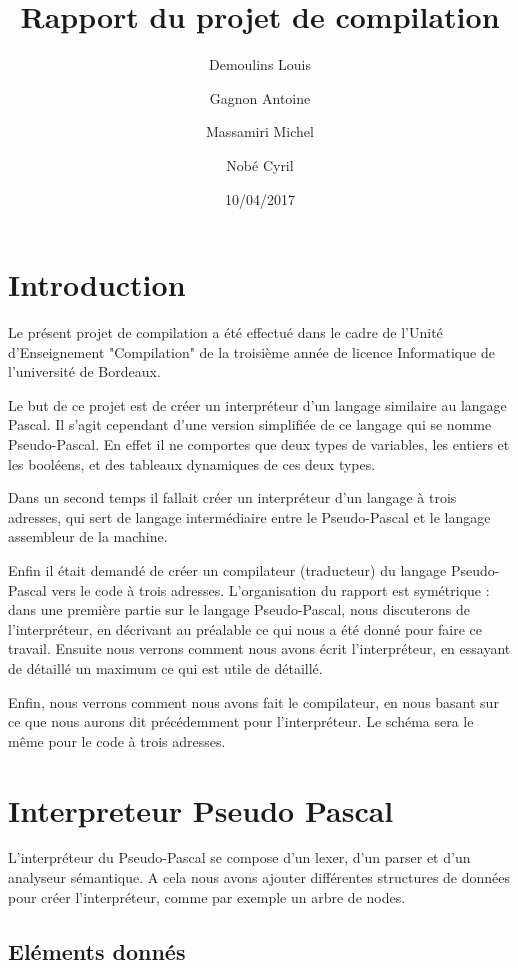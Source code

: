 \documentclass{article}
\title{Rapport du projet de compilation}
\date{10/04/2017}
\author{Demoulins Louis \and Gagnon Antoine \and Massamiri Michel \and Nobé Cyril}
\begin{document}
\maketitle
\newpage

\tableofcontents

\newpage
\section{Introduction}

Le présent projet de compilation a été effectué dans le cadre de l'Unité d'Enseignement "Compilation" de la troisième année de licence Informatique de l'université de Bordeaux.

\medbreak

Le but de ce projet est de créer un interpréteur d'un langage similaire au langage Pascal. Il s'agit cependant d'une version simplifiée de ce langage qui se nomme Pseudo-Pascal.
En effet il ne comportes que deux types de variables, les entiers et les booléens, et des tableaux dynamiques de ces deux types.

Dans un second temps il fallait créer un interpréteur d'un langage à trois adresses, qui sert de langage intermédiaire entre le Pseudo-Pascal et le langage assembleur de la machine.

Enfin il était demandé de créer un compilateur (traducteur) du langage Pseudo-Pascal vers le code à trois adresses.
\bigbreak
L'organisation du rapport est symétrique : dans une première partie sur le langage Pseudo-Pascal, nous discuterons de l'interpréteur, en décrivant au préalable ce qui nous a été donné pour faire ce travail.
Ensuite nous verrons comment nous avons écrit l'interpréteur, en essayant de détaillé un maximum ce qui est utile de détaillé.

Enfin, nous verrons comment nous avons fait le compilateur, en nous basant sur ce que nous aurons dit précédemment pour l'interpréteur.
Le schéma sera le même pour le code à trois adresses.


\newpage
\section{Interpreteur Pseudo Pascal}

L'interpréteur du Pseudo-Pascal se compose d'un lexer, d'un parser et d'un analyseur sémantique. A cela nous avons ajouter différentes structures de données pour créer l'interpréteur, comme par exemple un arbre de nodes.

\subsection{Eléments donnés}
\end{document}
